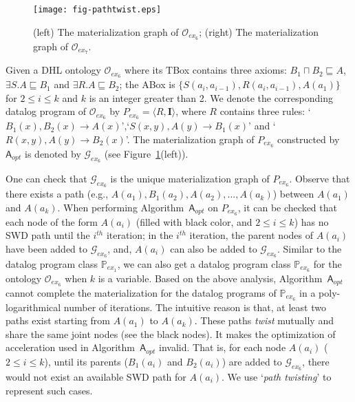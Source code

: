 \documentclass[final,1p,times]{elsarticle}
\begin{document}
\begin{figure}[htbp]
\begin{center}
\texttt{[image: fig-pathtwist.eps]}
\caption{(left) The materialization graph of $\mathcal{O}_{ex_6}$;
(right) The materialization graph of $\mathcal{O}_{ex_7}$.}
\label{fig:ex3_4}
\end{center}
\end{figure}

\begin{example}\label{exp:dhl}
Given a DHL ontology $\mathcal{O}_{ex_6}$ where its TBox contains three axioms:
$B_1\sqcap B_2\sqsubseteq A$, $\exists S.A\sqsubseteq B_1$ and $\exists R.A\sqsubseteq B_2$;
the ABox is $\{S(a_i,a_{i-1}), R(a_i,a_{i-1}), A(a_1)\}$
for $2\leq i\leq k$ and $k$ is an integer greater than 2.
We denote the corresponding datalog program of $\mathcal{O}_{ex_6}$ by $P_{ex_6}=\langle R, \textbf{I}\rangle$,
where $R$ contains three rules: `$B_1(x),B_2(x)\rightarrow A(x)$',`$S(x,y),A(y)\rightarrow B_1(x)$' and `$R(x,y),A(y)\rightarrow B_2(x)$'.
The materialization graph of $P_{ex_6}$ constructed by $\mathsf{A}_{opt}$ is denoted by $\mathcal{G}_{ex_6}$ (see Figure~\ref{fig:ex3_4}(left)).
\end{example}

One can check that $\mathcal{G}_{ex_6}$ is the unique materialization graph of $P_{ex_6}$.
Observe that there exists a path (e.g., $A(a_1),B_1(a_2),A(a_2),...,A(a_k)$) between $A(a_1)$ and $A(a_k)$.
When performing Algorithm~$\mathsf{A}_{opt}$ on $P_{ex_6}$, it can be checked that
each node of the form $A(a_i)$ (filled with black color,
and $2\leq i\leq k$) has no SWD path until the $i^{th}$ iteration;
in the $i^{th}$ iteration, the parent nodes of $A(a_i)$ have been added to $\mathcal{G}_{ex_6}$,
and, $A(a_i)$ can also be added to $\mathcal{G}_{ex_6}$.
Similar to the datalog program class $\mathbb{P}_{ex_1}$, we can also get a 
datalog program class $\mathbb{P}_{ex_6}$ for the ontology $\mathcal{O}_{ex_6}$
when $k$ is a variable. Based on the above analysis, Algorithm~$\mathsf{A}_{opt}$ cannot complete the materialization
for the datalog programs of $\mathbb{P}_{ex_6}$ in a poly-logarithmical
number of iterations.
The intuitive reason is that, at least two paths exist
starting from $A(a_1)$ to $A(a_k)$. These paths \emph{twist} mutually and share the same joint nodes (see the black nodes).
It makes the optimization of acceleration used in Algorithm~$\mathsf{A}_{opt}$ invalid.
That is, for each node $A(a_i)$ ($2\leq i\leq k$), until its parents ($B_1(a_i)$ and $B_2(a_i)$) are added
to $\mathcal{G}_{ex_6}$, there would not exist an available SWD path for $A(a_i)$.
We use `\emph{path twisting}' to represent such cases.
\end{document}
